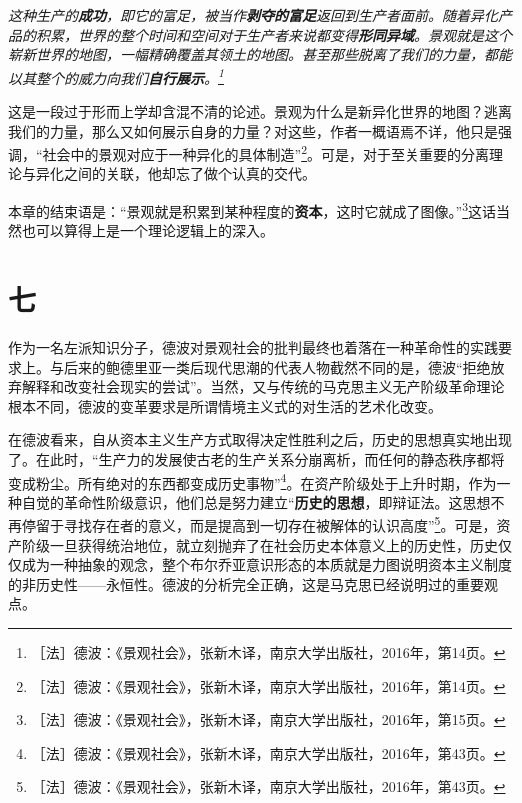 \documentclass[fontset=fandol, a4paper, 12pt, openright]{ctexbook}
\renewenvironment{quote}
  {\list{}{\rightmargin\leftmargin}%
   \item\relax\small\itshape\color{darkgray}}
  {\endlist}
\begin{document}
\begin{quote}
这种生产的\textbf{成功}，即它的富足，被当作\textbf{剥夺的富足}返回到生产者面前。随着异化产品的积累，世界的整个时间和空间对于生产者来说都变得\textbf{形同异域}。景观就是这个崭新世界的地图，一幅精确覆盖其领土的地图。甚至那些脱离了我们的力量，都能以其整个的威力向我们\textbf{自行展示}。\footnote{［法］德波：《景观社会》，张新木译，南京大学出版社，2016年，第14页。}
\end{quote}

这是一段过于形而上学却含混不清的论述。景观为什么是新异化世界的地图？逃离我们的力量，那么又如何展示自身的力量？对这些，作者一概语焉不详，他只是强调，“社会中的景观对应于一种异化的具体制造”\footnote{［法］德波：《景观社会》，张新木译，南京大学出版社，2016年，第14页。}。可是，对于至关重要的分离理论与异化之间的关联，他却忘了做个认真的交代。

本章的结束语是：“景观就是积累到某种程度的\textbf{资本}，这时它就成了图像。”\footnote{［法］德波：《景观社会》，张新木译，南京大学出版社，2016年，第15页。}这话当然也可以算得上是一个理论逻辑上的深入。

\section*{七}

作为一名左派知识分子，德波对景观社会的批判最终也着落在一种革命性的实践要求上。与后来的鲍德里亚一类后现代思潮的代表人物截然不同的是，德波“拒绝放弃解释和改变社会现实的尝试”。当然，又与传统的马克思主义无产阶级革命理论根本不同，德波的变革要求是所谓情境主义式的对生活的艺术化改变。

在德波看来，自从资本主义生产方式取得决定性胜利之后，历史的思想真实地出现了。在此时，“生产力的发展使古老的生产关系分崩离析，而任何的静态秩序都将变成粉尘。所有绝对的东西都变成历史事物”\footnote{［法］德波：《景观社会》，张新木译，南京大学出版社，2016年，第43页。}。在资产阶级处于上升时期，作为一种自觉的革命性阶级意识，他们总是努力建立“\textbf{历史的思想}，即辩证法。这思想不再停留于寻找存在者的意义，而是提高到一切存在被解体的认识高度”\footnote{［法］德波：《景观社会》，张新木译，南京大学出版社，2016年，第43页。}。可是，资产阶级一旦获得统治地位，就立刻抛弃了在社会历史本体意义上的历史性，历史仅仅成为一种抽象的观念，整个布尔乔亚意识形态的本质就是力图说明资本主义制度的非历史性——永恒性。德波的分析完全正确，这是马克思已经说明过的重要观点。
\end{document}
